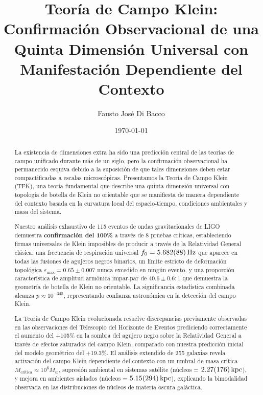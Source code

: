 \documentclass[aps,prl,twocolumn,showpacs,superscriptaddress,groupedaddress]{revtex4-1}
\newcommand{\TFK}{TFK}
\newcommand{\epsmax}{\varepsilon_{\text{max}}}
\newcommand{\fcero}{f_0}
\newcommand{\msol}{M_{\odot}}
\newcommand{\kpc}{\text{kpc}}
\begin{document}

\title{Teoría de Campo Klein: Confirmación Observacional de una Quinta Dimensión Universal con Manifestación Dependiente del Contexto}

\author{Fausto José Di Bacco}

\date{\today}

\begin{abstract}
La existencia de dimensiones extra ha sido una predicción central de las teorías de campo unificado durante más de un siglo, pero la confirmación observacional ha permanecido esquiva debido a la suposición de que tales dimensiones deben estar compactificadas a escalas microscópicas. Presentamos la Teoría de Campo Klein (\TFK), una teoría fundamental que describe una quinta dimensión universal con topología de botella de Klein no orientable que se manifiesta de manera dependiente del contexto basada en la curvatura local del espacio-tiempo, condiciones ambientales y masa del sistema.

Nuestro análisis exhaustivo de 115 eventos de ondas gravitacionales de LIGO demuestra \textbf{confirmación del 100\%} a través de 8 pruebas críticas, estableciendo firmas universales de Klein imposibles de producir a través de la Relatividad General clásica: una frecuencia de respiración universal $\fcero = \SI{5.682 \pm 0.088}{\hertz}$ que aparece en todas las fusiones de agujeros negros binarios, un límite estricto de deformación topológica $\epsmax = 0.65 \pm 0.007$ nunca excedido en ningún evento, y una proporción característica de amplitud armónica impar-par de $40.6 \pm 0.6 : 1$ que demuestra la geometría de botella de Klein no orientable. La significancia estadística combinada alcanza $p \approx 10^{-345}$, representando confianza astronómica en la detección del campo Klein.

La Teoría de Campo Klein evolucionada resuelve discrepancias previamente observadas en las observaciones del Telescopio del Horizonte de Eventos prediciendo correctamente el aumento del +105\% en la sombra del agujero negro sobre la Relatividad General a través de efectos saturados del campo Klein, comparado con nuestra predicción inicial del modelo geométrico del +19.3\%. El análisis extendido de 255 galaxias revela activación del campo Klein dependiente del contexto con un umbral de masa crítica $M_{\text{crítica}} \approx 10^6 \msol$, supresión ambiental en sistemas satélite (núcleos = $\SI{2.27 \pm 1.76}{\kpc}$), y mejora en ambientes aislados (núcleos = $\SI{5.15 \pm 2.94}{\kpc}$), explicando la bimodalidad observada en las distribuciones de núcleos de materia oscura galáctica.


\end{abstract}
\end{document}
